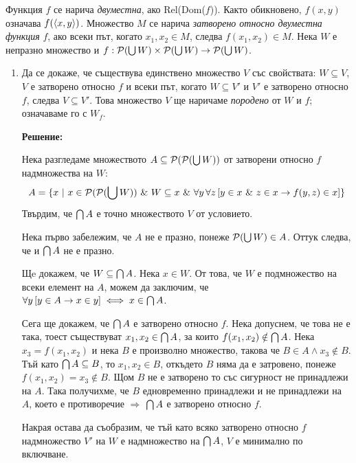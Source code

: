 
\begin{problem}
Функция $f$ се нарича \textit{двуместна}, ако Rel(Dom($f$)). Както обикновено,
$f(x, y)$ означава $f (\langle x, y \rangle)$. Множество $M$ се нарича
\textit{затворено относно двуместна функция} $f$,
ако всеки път, когато $x_1, x_2 \in M$, следва $f(x_1, x_2) \in M$.
Нека $W$ е непразно множество и $f: \mathcal{P}(\bigcup W) \times \mathcal{P}(\bigcup W) \to \mathcal{P}(\bigcup W)$.
\begin{enumerate}
\item Да се докаже, че съществува единствено множество $V$ със свойствата:
$W \subseteq V$, $V$ е затворено относно $f$ и всеки път, когато $W \subseteq V'$
и $V'$ е затворено относно $f$, следва $V \subseteq V'$. Това множество $V$ ще
наричаме \textit{породено} от $W$ и $f$; означаваме го с $W_f$.

\textbf{Решение:}

\smallbreak
\quad
Нека разгледаме множеството $A \subseteq \mathcal{P}(\mathcal{P}(\bigcup W))$ от затворени относно $f$ надмножества на $W$:
\[
	A = \{x\ |\ x \in \mathcal{P}(\mathcal{P}(\bigcup W)) \ \&\  W \subseteq x \ \&\  \forall y\, \forall z\, [ y \in x \ \&\  z \in x \to f(y, z) \in x ] \}
\]
\quad
Твърдим, че $\bigcap A$ е точно множеството $V$ от условието.

\begin{tcolorbox}[mybox={Доказателство:}]
\quad
Нека първо забележим, че $A$ не е празно, понеже $\mathcal{P}(\bigcup W) \in A$. Оттук следва, че и $\bigcap A$ не е празно.

\quad
Щe докажем, че $W \subseteq \bigcap A$. Нека $x \in W$.
От това, че $W$ е подмножество на всеки елемент на $A$, можем да заключим, че $\forall y\, [y \in A \to x \in y] \iff x \in \bigcap A$.

\quad
Сега ще докажем, че $\bigcap A$ е затворено относно $f$.
Нека допуснем, че това не е така, тоест съществуват $x_1, x_2 \in \bigcap A$,
за които $f(x_1, x_2) \notin \bigcap A$.
Нека $x_3 = f(x_1, x_2)$ и нека $B$ е произволно множество, такова че $B \in A \land x_3 \notin B$.
Тъй като $\bigcap A \subseteq B$, то $x_1, x_2 \in B$, откъдето $B$ няма да е затровено, понеже
$f(x_1, x_2) = x_3 \notin B$. Щом $B$ не е затворено то със сигурност не принадлежи на $A$.
Така получихме, че $B$ едновременно принадлежи и не принадлежи на $A$, което е противоречие
$\Rightarrow$ $\bigcap A$ е затворено относно $f$.

\quad
Накрая остава да съобразим, че
тъй като всяко затворено относно $f$ надмножество $V'$ на $W$ е надмножество на $\bigcap A$,
$V$ е минимално по включване.


\end{tcolorbox}
\end{enumerate}
\end{problem}
